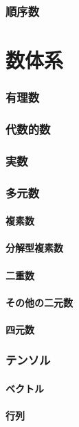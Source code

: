 \documentclass[hyperref,a4paper,12pt]{kininaruki}
\begin{document}
\section{順序数}
\newpage
\part{数体系}
\section{有理数}
\newpage
\section{代数的数}
\newpage
\section{実数}
\newpage
\section{多元数}
\subsection{複素数}
\newpage
\subsection{分解型複素数}
\newpage
\subsection{二重数}
\newpage
\subsection{その他の二元数}
\newpage
\subsection{四元数}
\newpage
\section{テンソル}
\subsection{ベクトル}
\newpage
\subsection{行列}
\newpage
\end{document}
